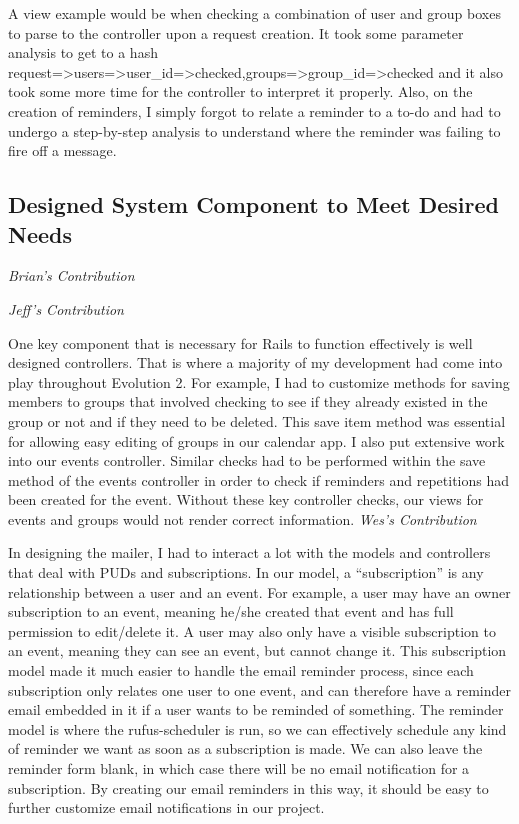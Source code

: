 \documentclass[11pt]{article}
\begin{document}
A view example would be when checking a combination of user and group boxes to parse to the controller upon a request creation. It took some parameter analysis to get to a hash request=>{users=>{user_id=>checked},groups=>{group_id=>{checked}}} and it also took  some more time for the controller to interpret it properly. Also, on the creation of reminders, I simply forgot to relate a reminder to a to-do and had to undergo a step-by-step analysis to understand where the reminder was failing to fire off a message.

\subsection{Designed System Component to Meet Desired Needs}

\textit{Brian's Contribution}



\textit{Jeff's Contribution}

One key component that is necessary for Rails to function effectively is well designed controllers.  That is where a majority of my development had come into play throughout Evolution 2.  For example, I had to customize methods for saving members to groups that involved checking to see if they already existed in the group or not and if they need to be deleted.  This save item method was essential for allowing easy editing of groups in our calendar app.  I also put extensive work into our events controller.  Similar checks had to be performed within the save method of the events controller in order to check if reminders and repetitions had been created for the event.  Without these key controller checks, our views for events and groups would not render correct information.
\textit{Wes's Contribution}

In designing the mailer, I had to interact a lot with the models and controllers that deal with PUDs and subscriptions.  In our model, a “subscription” is any relationship between a user and an event.  For example, a user may have an owner subscription to an event, meaning he/she created that event and has full permission to edit/delete it.  A user may also only have a visible subscription to an event, meaning they can see an event, but cannot change it.  This subscription model made it much easier to handle the email reminder process, since each subscription only relates one user to one event, and can therefore have a reminder email embedded in it if a user wants to be reminded of something.  The reminder model is where the rufus-scheduler is run, so we can effectively schedule any kind of reminder we want as soon as a subscription is made.  We can also leave the reminder form blank, in which case there will be no email notification for a subscription.  By creating our email reminders in this way, it should be easy to further customize email notifications in our project.
\end{document}

